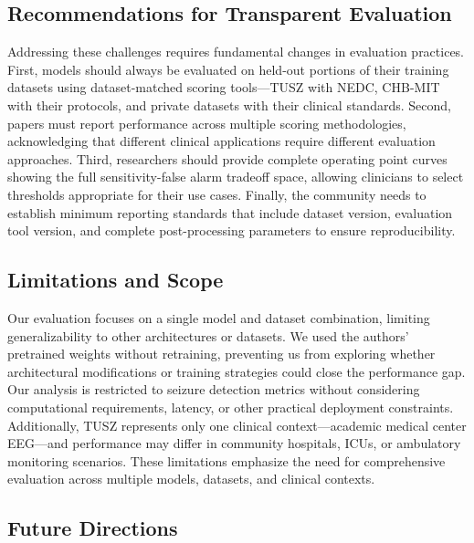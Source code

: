 \documentclass[
]{article}
\begin{document}
\hypertarget{recommendations-for-transparent-evaluation}{%
\subsection{Recommendations for Transparent
Evaluation}\label{recommendations-for-transparent-evaluation}}

Addressing these challenges requires fundamental changes in evaluation
practices. First, models should always be evaluated on held-out portions
of their training datasets using dataset-matched scoring tools---TUSZ
with NEDC, CHB-MIT with their protocols, and private datasets with their
clinical standards. Second, papers must report performance across
multiple scoring methodologies, acknowledging that different clinical
applications require different evaluation approaches. Third, researchers
should provide complete operating point curves showing the full
sensitivity-false alarm tradeoff space, allowing clinicians to select
thresholds appropriate for their use cases. Finally, the community needs
to establish minimum reporting standards that include dataset version,
evaluation tool version, and complete post-processing parameters to
ensure reproducibility.

\hypertarget{limitations-and-scope}{%
\subsection{Limitations and Scope}\label{limitations-and-scope}}

Our evaluation focuses on a single model and dataset combination,
limiting generalizability to other architectures or datasets. We used
the authors' pretrained weights without retraining, preventing us from
exploring whether architectural modifications or training strategies
could close the performance gap. Our analysis is restricted to seizure
detection metrics without considering computational requirements,
latency, or other practical deployment constraints. Additionally, TUSZ
represents only one clinical context---academic medical center EEG---and
performance may differ in community hospitals, ICUs, or ambulatory
monitoring scenarios. These limitations emphasize the need for
comprehensive evaluation across multiple models, datasets, and clinical
contexts.

\hypertarget{future-directions}{%
\subsection{Future Directions}\label{future-directions}}
\end{document}
